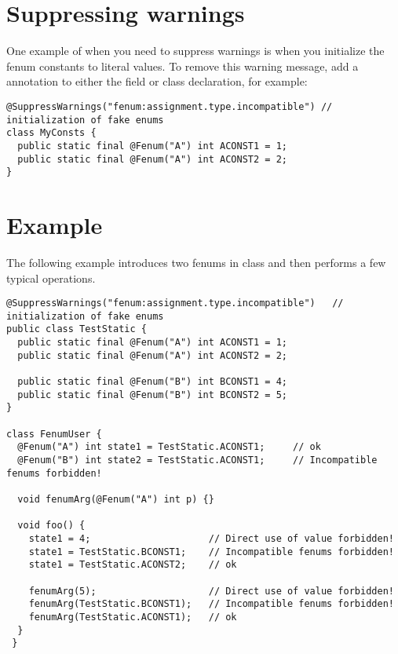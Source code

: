 \section{Suppressing warnings\label{fenum-suppressing}}

One example of when you need to suppress warnings is when you initialize the
fenum constants to literal values.
To remove this warning message, add a  annotation to either
the field or class declaration, for example:

\begin{Verbatim}
@SuppressWarnings("fenum:assignment.type.incompatible") // initialization of fake enums
class MyConsts {
  public static final @Fenum("A") int ACONST1 = 1;
  public static final @Fenum("A") int ACONST2 = 2;
}
\end{Verbatim}



\section{Example\label{fenum-example}}

The following example introduces two fenums in class 
and then performs a few typical operations.

\begin{Verbatim}
@SuppressWarnings("fenum:assignment.type.incompatible")   // initialization of fake enums
public class TestStatic {
  public static final @Fenum("A") int ACONST1 = 1;
  public static final @Fenum("A") int ACONST2 = 2;

  public static final @Fenum("B") int BCONST1 = 4;
  public static final @Fenum("B") int BCONST2 = 5;
}

class FenumUser {
  @Fenum("A") int state1 = TestStatic.ACONST1;     // ok
  @Fenum("B") int state2 = TestStatic.ACONST1;     // Incompatible fenums forbidden!

  void fenumArg(@Fenum("A") int p) {}

  void foo() {
    state1 = 4;                     // Direct use of value forbidden!
    state1 = TestStatic.BCONST1;    // Incompatible fenums forbidden!
    state1 = TestStatic.ACONST2;    // ok

    fenumArg(5);                    // Direct use of value forbidden!
    fenumArg(TestStatic.BCONST1);   // Incompatible fenums forbidden!
    fenumArg(TestStatic.ACONST1);   // ok
  }
 }
\end{Verbatim}

